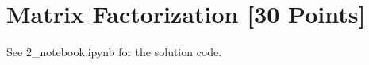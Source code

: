 \newpage
\problem[4] 

\begin{solution}

\end{solution}

\newpage
\problem[4] 
\begin{solution}
\end{solution}

\newpage
\problem[2] 
\begin{solution}

\end{solution}


\newpage
\section{Matrix Factorization [30 Points]}

\problem[5]

\begin{solution}

\end{solution}

\newpage
\problem[5]

\begin{solution}

\end{solution}

\newpage
\problem[10]

\begin{solution}
See 2_notebook.ipynb for the solution code.
\end{solution}

\newpage
\problem[5]

\begin{solution}

%


\end{solution}

\newpage
\problem[5]


